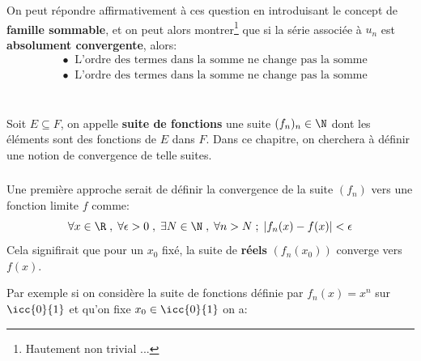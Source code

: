On peut répondre affirmativement à ces question en introduisant le concept de \textbf{famille sommable}, et on peut alors montrer\footnote[6]{Hautement non trivial ...} que si la série associée à \(u_n\) est \textbf{absolument convergente}, alors:
\begin{align*}
   &\bullet \;\; \text{L'ordre des termes dans la somme ne change pas la somme} \\
   &\bullet \;\; \text{L'ordre des termes dans la somme ne change pas la somme}
\end{align*}

\chapter*{}
Soit \(E \subseteq F\), on appelle \textbf{suite de fonctions} une suite \((f_n)_n\in\N\) dont les éléments sont des fonctions de \(E\) dans \(F\). Dans ce chapitre, on cherchera à définir une notion de convergence de telle suites.

\subsection*{}
Une première approche serait de définir la convergence de la suite \((f_n)\) vers une fonction limite \(f\) comme:
\[
   \forall x \in \R \; , \; \forall \epsilon > 0 \; , \; \exists N \in \N \; , \; \forall n > N \; ; \; |f_n(x) - f(x)| < \epsilon
\]
Cela signifirait que pour un \(x_0\) fixé, la suite de \textbf{réels} \((f_n(x_0))\) converge vers \(f(x)\).\<

Par exemple si on considère la suite de fonctions définie par \(f_n(x) = x^n\) sur \(\icc{0}{1}\) et qu'on fixe \(x_0 \in \icc{0}{1}\) on a:

\begin{center}
\end{center}

